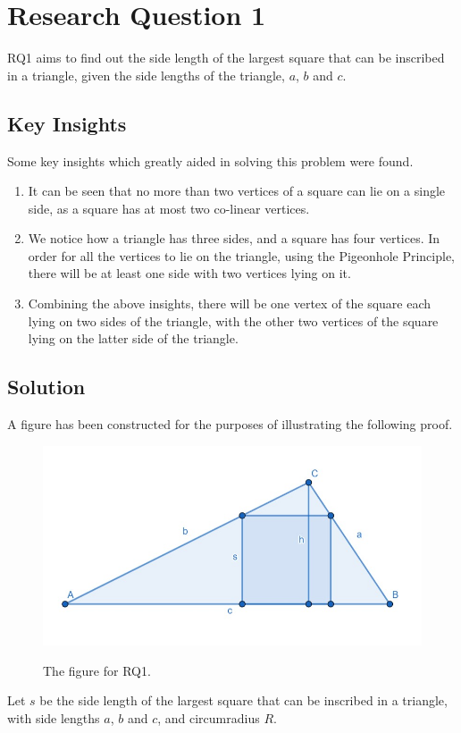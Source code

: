 \documentclass[12pt]{scrartcl}
\begin{document}
\section{Research Question 1}

RQ1 aims to find out the side length of the largest square that can be inscribed in a triangle,
given the side lengths of the triangle, $a$, $b$ and $c$.

\subsection{Key Insights}
Some key insights which greatly aided in solving this problem were found.
\begin{enumerate}
	\item It can be seen that no more than two vertices of a square can lie on a single side,
	      as a square has at most two co-linear vertices.
	\item We notice how a triangle has three sides, and a square has four vertices.
	      In order for all the vertices to lie on the triangle, using the Pigeonhole Principle,
	      there will be at least one side with two vertices lying on it.
	\item Combining the above insights, there will be one vertex of the square
	      each lying on two sides of the triangle, with the other two vertices of the square
	      lying on the latter side of the triangle.
\end{enumerate}

\subsection{Solution}
A figure has been constructed for the purposes of illustrating the following proof.
\begin{figure}[htpb]
	\centering
	\includegraphics[scale=.75]{images/rq1.jpg}
	\label{fig:rq1_img}
	\caption{The figure for RQ1.}
\end{figure}
Let $s$ be the side length of the largest square that can be inscribed in a triangle,
with side lengths $a$, $b$ and $c$, and circumradius $R$.
\end{document}
